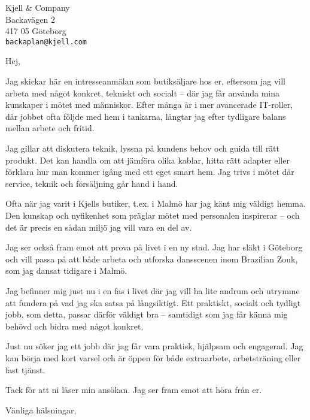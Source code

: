 \documentclass[a4paper]{scrlttr2}
\begin{document}
\begin{letter}{Kjell \& Company\\Backavägen 2\\417 05 Göteborg\\\texttt{backaplan@kjell.com}}

\opening{Hej,}

Jag skickar här en intresseanmälan som butiksäljare hos er, eftersom jag vill arbeta med något konkret, tekniskt och socialt – där jag får använda mina kunskaper i mötet med människor. Efter många år i mer avancerade IT-roller, där jobbet ofta följde med hem i tankarna, längtar jag efter tydligare balans mellan arbete och fritid.

Jag gillar att diskutera teknik, lyssna på kundens behov och guida till rätt produkt. Det kan handla om att jämföra olika kablar, hitta rätt adapter eller förklara hur man kommer igång med ett eget smart hem. Jag trivs i mötet där service, teknik och försäljning går hand i hand.

Ofta när jag varit i Kjells butiker, t.ex. i Malmö har jag känt mig väldigt hemma. Den kunskap och nyfikenhet som präglar mötet med personalen inspirerar – och det är precis en sådan miljö jag vill vara en del av.

Jag ser också fram emot att prova på livet i en ny stad. Jag har släkt i Göteborg och vill passa på att både arbeta och utforska dansscenen inom Brazilian Zouk, som jag dansat tidigare i Malmö.

Jag befinner mig just nu i en fas i livet där jag vill ha lite andrum och utrymme att fundera på vad jag ska satsa på långsiktigt. Ett praktiskt, socialt och tydligt jobb, som detta, passar därför väldigt bra – samtidigt som jag får känna mig behövd och bidra med något konkret.

Just nu söker jag ett jobb där jag får vara praktisk, hjälpsam och engagerad. Jag kan börja med kort varsel och är öppen för både extraarbete, arbetsträning eller fast tjänst.


Tack för att ni läser min ansökan. Jag ser fram emot att höra från er.

\closing{Vänliga hälsningar,}

\end{letter}
\end{document}
